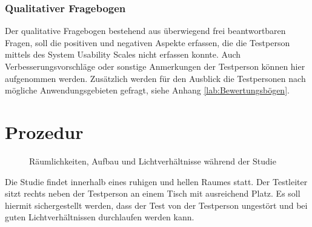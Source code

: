 \documentclass[a4paper,12pt,bibliography=totoc]{scrreprt}%
\begin{document}
\subsubsection{Qualitativer Fragebogen}
Der qualitative Fragebogen bestehend aus überwiegend frei beantwortbaren Fragen, soll die positiven und negativen Aspekte erfassen, die die Testperson mittels des System Usability Scales nicht erfassen konnte. Auch Verbesserungsvorschläge oder sonstige Anmerkungen der Testperson können hier aufgenommen werden. Zusätzlich werden für den Ausblick die Testpersonen nach mögliche Anwendungsgebieten gefragt, siehe Anhang \ref{lab:Bewertungsbögen}.

\section{Prozedur}
\begin{figure}
\centering
{}
\caption{Räumlichkeiten, Aufbau und Lichtverhältnisse während der Studie}
\label{klickschwebepositionen}
\end{figure}
Die Studie findet innerhalb eines ruhigen und hellen Raumes statt. Der Testleiter sitzt rechts neben der Testperson an einem Tisch mit ausreichend Platz. Es soll hiermit sichergestellt werden, dass der Test von der Testperson ungestört und bei guten Lichtverhältnissen durchlaufen werden kann.\\
\end{document}
